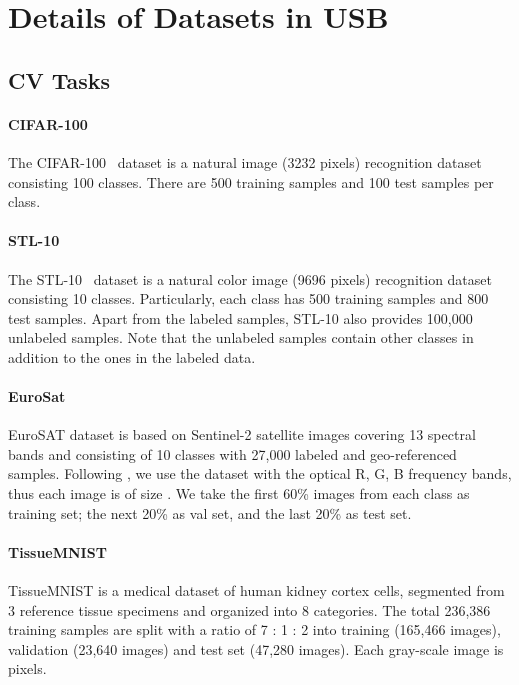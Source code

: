 \documentclass{article}
\begin{document}
\section{Details of Datasets in USB}
\label{sec-details-usb}

\subsection{CV Tasks}
\label{sec-details-usb-cv}

\paragraph{CIFAR-100}

The CIFAR-100~\cite{krizhevsky2009learning} dataset is a natural image (3232 pixels) recognition dataset consisting 100 classes. There are 500 training samples and 100 test samples per class.

\paragraph{STL-10}
The STL-10~\cite{coates2011analysis} dataset is a natural color image (9696 pixels) recognition dataset consisting 10 classes. Particularly, each class has 500 training samples and 800 test samples. Apart from the labeled samples, STL-10 also provides 100,000 unlabeled samples. Note that the unlabeled samples contain other classes in addition to the ones in the labeled data.






\paragraph{EuroSat}
EuroSAT \cite{helber2019eurosat,helber2018introducing} dataset is based on Sentinel-2 satellite images covering 13 spectral bands and consisting of 10 classes with 27,000 labeled and geo-referenced samples.
Following \cite{zhai2019large}, we use the dataset with the optical R, G, B frequency bands, thus each image is of size .
We take the first 60\% images from each class as training set; the next 20\% as val set, and the last 20\% as test set.

\paragraph{TissueMNIST}
TissueMNIST \cite{medmnistv1,medmnistv2} is a medical dataset of human kidney cortex cells, segmented from 3 reference tissue specimens and organized into 8 categories.
The total 236,386 training samples are split with a ratio of 7 : 1 : 2 into training (165,466 images), validation (23,640 images) and test set (47,280 images).
Each gray-scale image is  pixels.
\end{document}
